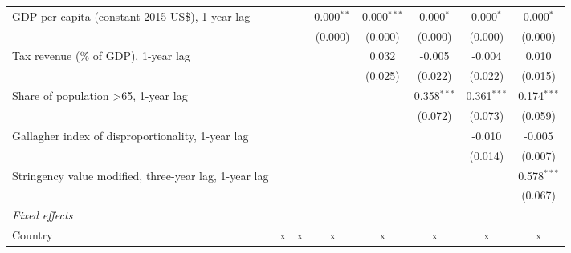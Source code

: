 \begin{tabular}{lccccccc}
   GDP per capita (constant 2015 US\$), 1-year lag                                             &         &         & 0.000$^{**}$ & 0.000$^{***}$ & 0.000$^{*}$   & 0.000$^{*}$   & 0.000$^{*}$\\   
                                                                                               &         &         & (0.000)      & (0.000)       & (0.000)       & (0.000)       & (0.000)\\   
   Tax revenue (\% of GDP), 1-year lag                                                         &         &         &              & 0.032         & -0.005        & -0.004        & 0.010\\   
                                                                                               &         &         &              & (0.025)       & (0.022)       & (0.022)       & (0.015)\\   
   Share of population >65, 1-year lag                                                         &         &         &              &               & 0.358$^{***}$ & 0.361$^{***}$ & 0.174$^{***}$\\   
                                                                                               &         &         &              &               & (0.072)       & (0.073)       & (0.059)\\   
   Gallagher index of disproportionality, 1-year lag                                           &         &         &              &               &               & -0.010        & -0.005\\   
                                                                                               &         &         &              &               &               & (0.014)       & (0.007)\\   
   Stringency value modified, three-year lag, 1-year lag                                       &         &         &              &               &               &               & 0.578$^{***}$\\   
                                                                                               &         &         &              &               &               &               & (0.067)\\   
   \emph{Fixed effects}\\
   Country                                                                                     & x       & x       & x            & x             & x             & x             & x\\  

\end{tabular}
